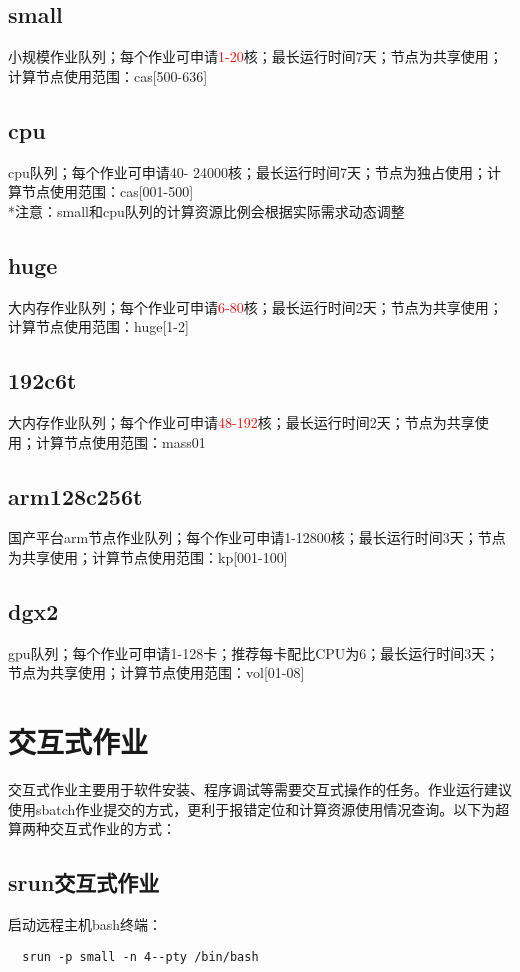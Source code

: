 \documentclass[cn, 12pt, hang, black, chinese]{elegantbook}
\begin{document}
\subsection*{small}
小规模作业队列；每个作业可申请\textcolor{red}{1-20}核；最长运行时间7天；节点为共享使用；计算节点使用范围：cas[500-636]

\subsection*{cpu}
cpu队列；每个作业可申请40- 24000核；最长运行时间7天；节点为独占使用；计算节点使用范围：cas[001-500]\\*注意：small和cpu队列的计算资源比例会根据实际需求动态调整

\subsection*{huge}
大内存作业队列；每个作业可申请\textcolor{red}{6-80}核；最长运行时间2天；节点为共享使用；计算节点使用范围：huge[1-2]

\subsection*{192c6t}
大内存作业队列；每个作业可申请\textcolor{red}{48-192}核；最长运行时间2天；节点为共享使用；计算节点使用范围：mass01

\subsection*{arm128c256t}
国产平台arm节点作业队列；每个作业可申请1-12800核；最长运行时间3天；节点为共享使用；计算节点使用范围：kp[001-100]

\subsection*{dgx2}
gpu队列；每个作业可申请1-128卡；推荐每卡配比CPU为6；最长运行时间3天；节点为共享使用；计算节点使用范围：vol[01-08]

\section{交互式作业}

交互式作业主要用于软件安装、程序调试等需要交互式操作的任务。作业运行建议使用sbatch作业提交的方式，更利于报错定位和计算资源使用情况查询。以下为超算两种交互式作业的方式：

\subsection*{srun交互式作业}
启动远程主机bash终端：
\begin{lstlisting}
  srun -p small -n 4--pty /bin/bash
\end{lstlisting}
\end{document}
